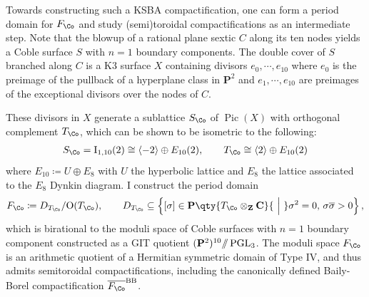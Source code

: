 \documentclass{amsart}
\begin{document}
\begin{remark}

\label{rmk:divisors-for-coble-compactification} Towards constructing such a KSBA compactification, one can form a period domain for \(F_{\Co}\) and study (semi)toroidal compactifications as an intermediate step. Note that the blowup of a rational plane sextic \(C\) along its ten nodes yields a Coble surface \(S\) with \(n=1\) boundary components. The double cover of \(S\) branched along \(C\) is a K3 surface \(X\) containing divisors \(e_0,\cdots, e_{10}\) where \(e_0\) is the preimage of the pullback of a hyperplane class in \({\mathbf{P}}^2\) and \(e_1,\cdots, e_{10}\) are preimages of the exceptional divisors over the nodes of \(C\).

These divisors in \(X\) generate a sublattice \(S_{\Co}\) of \(\operatorname{Pic}(X)\) with orthogonal complement \(T_{\Co}\), which can be shown to be isometric to the following: \begin{align*} S_{\Co} ={\rm{I}}_{1, 10}(2) \cong \left\langle{-2}\right\rangle \oplus E_{10}(2), \qquad T_{\Co}\cong \left\langle{2}\right\rangle \oplus E_{10}(2) \end{align*} where \(E_{10} \coloneqq U \oplus E_8\) with \(U\) the hyperbolic lattice and \(E_8\) the lattice associated to the \(E_8\) Dynkin diagram. I construct the period domain \[
F_{\Co} \coloneqq D_{T_\Co}/{\operatorname{O}}(T_\Co),\qquad D_{T_\Co} \subseteq \left\{{ [\sigma] \in {\mathbf{P}}\qty{T_{\Co}\otimes_{{\mathbf{Z}}} {\mathbf{C}}} {~\mathrel{\Big\vert}~}\sigma^2 = 0,\, \sigma\overline{\sigma }>0 }\right\}
,\] which is birational to the moduli space of Coble surfaces with \(n=1\) boundary component constructed as a GIT quotient \(({\mathbf{P}}^2)^{10}{ \mathbin{/\mkern-6mu/}}\operatorname{PGL}_3\). The moduli space \(F_{\Co}\) is an arithmetic quotient of a Hermitian symmetric domain of Type IV, and thus admits semitoroidal compactifications, including the canonically defined Baily-Borel compactification \(\overline{ F_{\Co} }^{\operatorname{BB}}\).

\end{remark}
\end{document}

